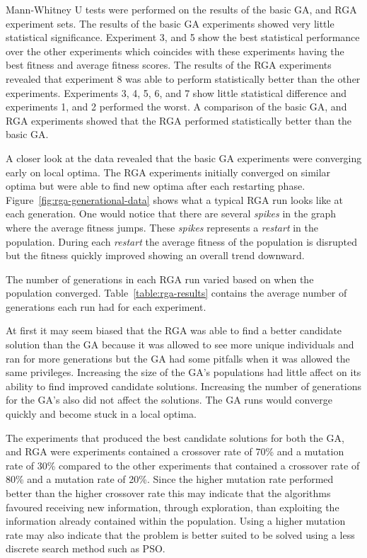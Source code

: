 Mann-Whitney U tests were performed on the results of the basic GA, and RGA experiment sets. The results of the basic GA experiments showed very little statistical significance. Experiment 3, and 5 show the best statistical performance over the other experiments which coincides with these experiments having the best fitness and average fitness scores. The results of the RGA experiments revealed that experiment 8 was able to perform statistically better than the other experiments. Experiments 3, 4, 5, 6, and 7 show little statistical difference and experiments 1, and 2 performed the worst. A comparison of the basic GA, and RGA experiments showed that the RGA performed statistically better than the basic GA.

A closer look at the data revealed that the basic GA experiments were converging early on local optima. The RGA experiments initially converged on similar optima but were able to find new optima after each restarting phase. Figure~\ref{fig:rga-generational-data} shows what a typical RGA run looks like at each generation. One would notice that there are several \textit{spikes} in the graph where the average fitness jumps. These \textit{spikes} represents a \textit{restart} in the population. During each \textit{restart} the average fitness of the population is disrupted but the fitness quickly improved showing an overall trend downward.

The number of generations in each RGA run varied based on when the population converged. Table~\ref{table:rga-results} contains the average number of generations each run had for each experiment.

At first it may seem biased that the RGA was able to find a better candidate solution than the GA because it was allowed to see more unique individuals and ran for more generations but the GA had some pitfalls when it was allowed the same privileges. Increasing the size of the GA's populations had little affect on its ability to find improved candidate solutions. Increasing the number of generations for the GA's also did not affect the solutions. The GA runs would converge quickly and become stuck in a local optima.

The experiments that produced the best candidate solutions for both the GA, and RGA were experiments contained a crossover rate of 70\% and a mutation rate of 30\% compared to the other experiments that contained a crossover rate of 80\% and a mutation rate of 20\%. Since the higher mutation rate performed better than the higher crossover rate this may indicate that the algorithms favoured receiving new information, through exploration, than exploiting the information already contained within the population. Using a higher mutation rate may also indicate that the problem is better suited to be solved using a less discrete search method such as PSO.

